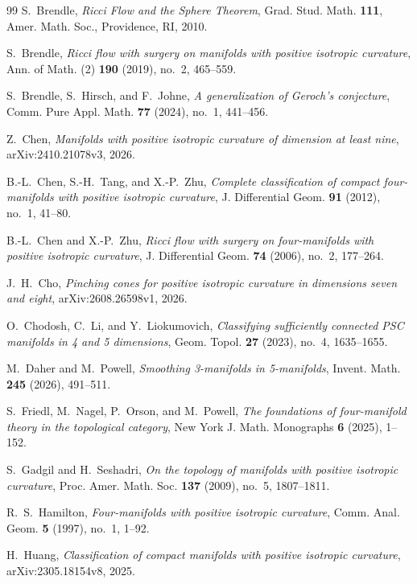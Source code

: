 \documentclass[11pt]{amsart}
\theoremstyle{definition}
\begin{document}
\begin{thebibliography}{99}
S.~Brendle, \emph{Ricci Flow and the Sphere Theorem},  Grad. Stud. Math. \textbf{111}, Amer. Math. Soc., Providence, RI, 2010.

S.~Brendle, \emph{Ricci flow with surgery on manifolds with positive isotropic curvature}, Ann. of Math. (2) \textbf{190} (2019), no.~2, 465--559.

S.~Brendle, S.~Hirsch, and F.~Johne,
\emph{A generalization of Geroch's conjecture},
Comm. Pure Appl. Math. \textbf{77} (2024), no.~1, 441--456.

Z.~Chen, \emph{Manifolds with positive isotropic curvature of dimension at least nine}, arXiv:2410.21078v3, 2026.

B.-L.~Chen, S.-H.~Tang, and X.-P.~Zhu, \emph{Complete classification of compact four-manifolds with positive isotropic curvature}, J. Differential Geom. \textbf{91} (2012), no.~1, 41--80.

B.-L.~Chen and X.-P.~Zhu, \emph{Ricci flow with surgery on four-manifolds with positive isotropic curvature}, J. Differential Geom. \textbf{74} (2006), no.~2, 177--264.

J.~H.~Cho, \emph{Pinching cones for positive isotropic curvature in dimensions seven and eight}, arXiv:2608.26598v1, 2026.

O.~Chodosh, C.~Li, and Y.~Liokumovich, \emph{Classifying sufficiently connected PSC manifolds in 4 and 5 dimensions}, Geom. Topol. \textbf{27} (2023), no.~4, 1635--1655.

M.~Daher and M.~Powell, \emph{Smoothing 3-manifolds in 5-manifolds}, Invent. Math. \textbf{245} (2026), 491--511.

S.~Friedl, M.~Nagel, P.~Orson, and M.~Powell,
\emph{The foundations of four-manifold theory in the topological category},
New York J. Math. Monographs \textbf{6} (2025), 1--152.


S.~Gadgil and H.~Seshadri, \emph{On the topology of manifolds with positive isotropic curvature}, Proc. Amer. Math. Soc. \textbf{137} (2009), no.~5, 1807--1811.

R.~S.~Hamilton, \emph{Four-manifolds with positive isotropic curvature}, Comm. Anal. Geom. \textbf{5} (1997), no.~1, 1--92.


H.~Huang, \emph{Classification of compact manifolds with positive isotropic curvature}, arXiv:2305.18154v8, 2025.


\end{thebibliography}
\end{document}
